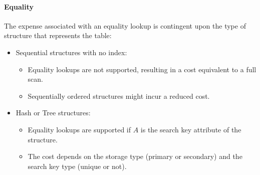 \paragraph*{Equality}
The expense associated with an equality lookup is contingent upon the type of structure that represents the table:
\begin{itemize}
    \item Sequential structures with no index:
        \begin{itemize}
            \item Equality lookups are not supported, resulting in a cost equivalent to a full scan.
            \item Sequentially ordered structures might incur a reduced cost.
        \end{itemize}
    \item Hash or Tree structures:
        \begin{itemize}
            \item Equality lookups are supported if $A$ is the search key attribute of the structure.
            \item The cost depends on the storage type (primary or secondary) and the search key type (unique or not).
        \end{itemize}
\end{itemize}

